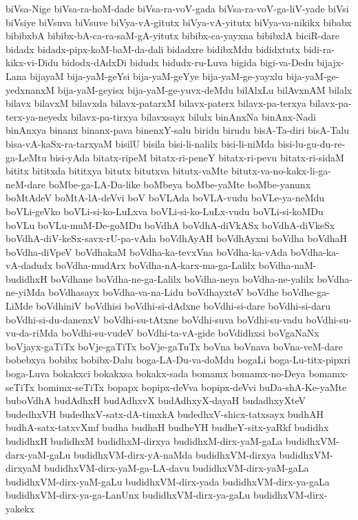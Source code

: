 {biVsa-Nige
biVsa-ra-hoM-dade
biVsa-ra-voV-gada
biVsa-ra-voV-ga-liV-yade
biVsi
biVsiye
biVsuva
biVsuve
biVya-vA-gitutx
biVya-vA-yitutx
biVya-va-nikikx
bibabx
bibibxbA
bibibx-bA-ca-ra-saM-gA-yitutx
bibibx-ca-yayxna
bibibxlA
biciR-dare
bidadx
bidadx-pipx-koM-baM-da-dali
bidadxre
bidibxMdu
bididxtutx
bidi-ra-kikx-vi-Didu
bidodx-dAdxDi
bidudx
bidudx-ru-Luva
bigida
bigi-va-Dedu
bijajx-Lana
bijayaM
bija-yaM-geYsi
bija-yaM-geYye
bija-yaM-ge-yayxlu
bija-yaM-ge-yedxnanxM
bija-yaM-geyisx
bija-yaM-ge-yuvx-deMdu
bilAlxLu
bilAvxnAM
bilalx
bilavx
bilavxM
bilavxda
bilavx-patarxM
bilavx-paterx
bilavx-pa-terxya
bilavx-pa-terx-ya-neyedx
bilavx-pa-tirxya
bilavxsayx
bilulx
binAnxNa
binAnx-Nadi
binAnxya
binanx
binanx-pava
binenxY-salu
biridu
birudu
bisA-Ta-diri
bisA-Talu
bisa-vA-kaSx-ra-tarxyaM
bisilU
bisila
bisi-li-nalilx
bisi-li-niMda
bisi-lu-gu-du-re-ga-LeMtu
bisi-yAda
bitatx-ripeM
bitatx-ri-peneY
bitatx-ri-pevu
bitatx-ri-sidaM
bititx
bititxda
bititxya
bitutx
bitutxva
bitutx-vaMte
bitutx-va-no-kakx-li-ga-neM-dare
boMbe-ga-LA-Da-like
boMbeya
boMbe-yaMte
boMbe-yanunx
boMtAdeV
boMtA-lA-deVvi
boV
boVLAda
boVLA-vudu
boVLe-ya-neMdu
boVLi-geVko
boVLi-si-ko-LuLxva
boVLi-si-ko-LuLx-vudu
boVLi-si-koMDu
boVLu
boVLu-muM-De-goMDu
boVdhA
boVdhA-diVkASx
boVdhA-diVkeSx
boVdhA-diV-keSx-savx-rU-pa-vAda
boVdhAyAH
boVdhAyxni
boVdha
boVdhaH
boVdha-diVpeV
boVdhakaM
boVdha-ka-tevxVna
boVdha-ka-vAda
boVdha-ka-vA-dadudx
boVdha-mudArx
boVdha-nA-karx-ma-ga-Lalilx
boVdha-naM-budidhxH
boVdhane
boVdha-ne-ga-Lalilx
boVdha-neya
boVdha-ne-yalilx
boVdha-ne-yiMda
boVdhasayx
boVdha-va-na-Lidu
boVdhayxteV
boVdhe
boVdhe-ga-LiMde
boVdhiniV
boVdhisi
boVdhi-si-dAdxne
boVdhi-si-dare
boVdhi-si-daru
boVdhi-si-du-danenxV
boVdhi-su-tAtxne
boVdhi-suva
boVdhi-su-vadu
boVdhi-su-vu-da-riMda
boVdhi-su-vudeV
boVdhi-ta-vA-gide
boVdidhxsi
boVgaNaNx
boVjayx-gaTiTx
boVje-gaTiTx
boVje-gaTuTx
boVna
boVnava
boVna-veM-dare
bobebxya
bobibx
bobibx-Dalu
boga-LA-Du-va-doMdu
bogaLi
boga-Lu-titx-pipxri
boga-Luva
bokakxci
bokakxsa
bokakx-sada
bomamx
bomamx-no-Deya
bomamx-seTiTx
bomimx-seTiTx
bopapx
bopipx-deVva
bopipx-deVvi
buDa-shA-Ke-yaMte
buboVdhA
budAdhxH
budAdhxvX
budAdhxyX-dayaH
budadhxyXteV
budedhxVH
budedhxV-satx-dA-timxkA
budedhxV-shicx-tatxsayx
budhAH
budhA-satx-tatxvXmf
budha
budhaH
budheYH
budheY-sitx-yaRkf
budidhx
budidhxH
budidhxM
budidhxM-dirxya
budidhxM-dirx-yaM-gaLa
budidhxVM-darx-yaM-gaLu
budidhxVM-dirx-yA-naMda
budidhxVM-dirxya
budidhxVM-dirxyaM
budidhxVM-dirx-yaM-ga-LA-davu
budidhxVM-dirx-yaM-gaLa
budidhxVM-dirx-yaM-gaLu
budidhxVM-dirx-yada
budidhxVM-dirx-ya-gaLa
budidhxVM-dirx-ya-ga-LanUnx
budidhxVM-dirx-ya-gaLu
budidhxVM-dirx-yakekx
}
